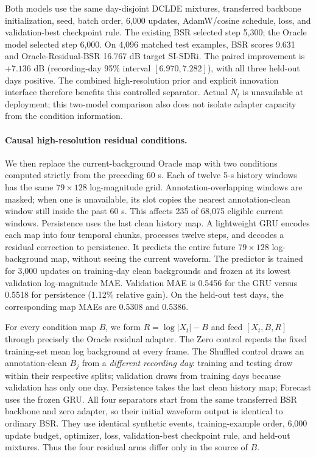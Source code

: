 \documentclass[conference]{IEEEtran}
\begin{document}
Both models use the same day-disjoint DCLDE mixtures, transferred backbone
initialization, seed, batch order, 6,000 updates, AdamW/cosine schedule,
loss, and validation-best checkpoint rule.  The existing BSR selected step
5,300; the Oracle model selected step 6,000.  On 4,096 matched test examples,
BSR scores 9.631 and Oracle-Residual-BSR 16.767 dB target SI-SDRi.
The paired improvement is $+7.136$ dB (recording-day 95\% interval
$[6.970,7.282]$), with all three held-out days positive.  The combined
high-resolution prior and explicit innovation interface therefore benefits
this controlled separator.  Actual $N_t$ is unavailable at deployment;
this two-model comparison also does not isolate adapter capacity from the
condition information.

\paragraph{Causal high-resolution residual conditions.}
We then replace the current-background Oracle map with two conditions computed
strictly from the preceding 60 s.  Each of twelve 5-s history windows has the
same $79\times128$ log-magnitude grid.  Annotation-overlapping windows are
masked; when one is unavailable, its slot copies the nearest annotation-clean
window still inside the past 60 s.  This affects 235 of 68,075 eligible
current windows.  Persistence uses the last clean history map.  A lightweight
GRU encodes each map into four temporal chunks, processes twelve steps, and
decodes a residual correction to persistence.  It predicts the entire future
$79\times128$ log-background map, without seeing the current waveform.
The predictor is trained for 3,000 updates on training-day clean backgrounds
and frozen at its lowest validation log-magnitude MAE.  Validation MAE is
0.5456 for the GRU versus 0.5518 for persistence (1.12\% relative gain).
On the held-out test days, the corresponding map MAEs are 0.5308 and 0.5386.

For every condition map $B$, we form $R=\log|X_t|-B$ and feed
$[X_t,B,R]$ through precisely the Oracle residual adapter.  The Zero
control repeats the fixed training-set mean log background at every frame.
The Shuffled control draws an annotation-clean $B_j$ from a \emph{different
recording day}: training and testing draw within their respective splits;
validation draws from training days because validation has only one day.
Persistence takes the last clean history map; Forecast uses the frozen GRU.
All four separators start from the same transferred BSR backbone and zero
adapter, so their initial waveform output is identical to ordinary BSR.
They use identical synthetic events, training-example order, 6,000 update
budget, optimizer, loss, validation-best checkpoint rule, and held-out
mixtures.  Thus the four residual arms differ only in the source of $B$.
\end{document}
